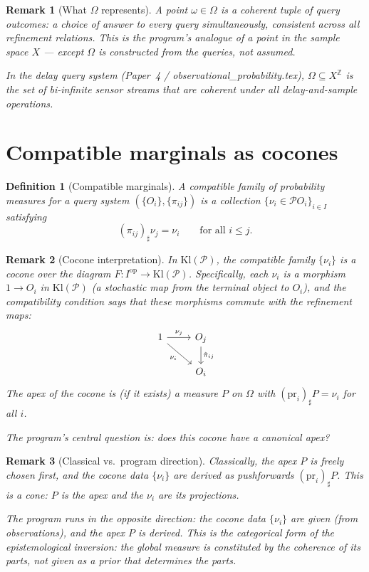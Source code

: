 \documentclass[11pt]{article}
\newtheorem{definition}{Definition}
\newtheorem{remark}{Remark}
\newcommand{\Kl}{\mathrm{Kl}}
\newcommand{\Pcal}{\mathcal{P}}
\newcommand{\op}{\mathrm{op}}
\newcommand{\pr}{\mathrm{pr}}
\begin{document}
\begin{remark}[What $\Omega$ represents]
A point $\omega \in \Omega$ is a \emph{coherent tuple} of query outcomes: a
choice of answer to every query simultaneously, consistent across all
refinement relations.  This is the program's analogue of a point in the sample
space $X$ --- except $\Omega$ is constructed from the queries, not assumed.

In the delay query system (Paper~4 / \emph{observational\_probability.tex}),
$\Omega \subseteq X^{\mathbb{Z}}$ is the set of bi-infinite sensor streams
that are coherent under all delay-and-sample operations.
\end{remark}

\section{Compatible marginals as cocones}
\label{sec:cocones}

\begin{definition}[Compatible marginals]\label{def:compat-marginals}
A \emph{compatible family of probability measures} for a query system
$(\{O_i\}, \{\pi_{ij}\})$ is a collection $\{\nu_i \in \Pcal O_i\}_{i \in I}$
satisfying
\[
  (\pi_{ij})_\sharp \nu_j = \nu_i \qquad \text{for all } i \leq j.
\]
\end{definition}

\begin{remark}[Cocone interpretation]
In $\Kl(\Pcal)$, the compatible family $\{\nu_i\}$ is a \emph{cocone} over
the diagram $F : I^\op \to \Kl(\Pcal)$.  Specifically, each $\nu_i$ is a
morphism $1 \to O_i$ in $\Kl(\Pcal)$ (a stochastic map from the terminal
object to $O_i$), and the compatibility condition says that these morphisms
commute with the refinement maps:
\[
\begin{tikzcd}
  1 \arrow[r, "\nu_j"] \arrow[dr, "\nu_i"'] & O_j \arrow[d, "\hat\pi_{ij}"] \\
  & O_i
\end{tikzcd}
\]
The apex of the cocone is (if it exists) a measure $P$ on $\Omega$ with
$(\pr_i)_\sharp P = \nu_i$ for all $i$.

The program's central question is: \emph{does this cocone have a canonical
apex?}
\end{remark}

\begin{remark}[Classical vs.\ program direction]
Classically, the apex $P$ is freely chosen first, and the cocone data
$\{\nu_i\}$ are derived as pushforwards $(\pr_i)_\sharp P$.  This is a
\emph{cone}: $P$ is the apex and the $\nu_i$ are its projections.

The program runs in the opposite direction: the cocone data $\{\nu_i\}$ are
given (from observations), and the apex $P$ is derived.  This is the
categorical form of the epistemological inversion: the global measure is
constituted by the coherence of its parts, not given as a prior that
determines the parts.
\end{remark}
\end{document}
